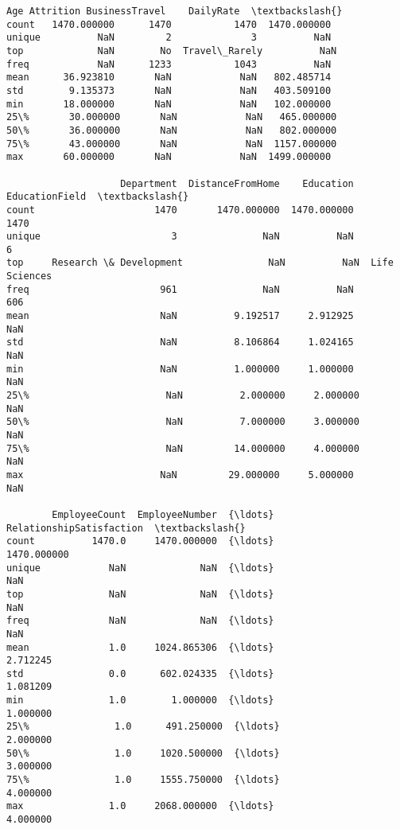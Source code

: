 \documentclass[11pt]{article}
\makeatletter
\newcommand{\boxspacing}{\kern\kvtcb@left@rule\kern\kvtcb@boxsep}
\newcommand{\prompt}[4]{
        {\ttfamily\llap{{\color{#2}[#3]:\hspace{3pt}#4}}\vspace{-\baselineskip}}
    }
\makeatother
\begin{document}
            \begin{tcolorbox}[breakable, size=fbox, boxrule=.5pt, pad at break*=1mm, opacityfill=0]
\prompt{Out}{outcolor}{19}{\boxspacing}
\begin{Verbatim}[commandchars=\\\{\}]
                Age Attrition BusinessTravel    DailyRate  \textbackslash{}
count   1470.000000      1470           1470  1470.000000
unique          NaN         2              3          NaN
top             NaN        No  Travel\_Rarely          NaN
freq            NaN      1233           1043          NaN
mean      36.923810       NaN            NaN   802.485714
std        9.135373       NaN            NaN   403.509100
min       18.000000       NaN            NaN   102.000000
25\%       30.000000       NaN            NaN   465.000000
50\%       36.000000       NaN            NaN   802.000000
75\%       43.000000       NaN            NaN  1157.000000
max       60.000000       NaN            NaN  1499.000000

                    Department  DistanceFromHome    Education EducationField  \textbackslash{}
count                     1470       1470.000000  1470.000000           1470
unique                       3               NaN          NaN              6
top     Research \& Development               NaN          NaN  Life Sciences
freq                       961               NaN          NaN            606
mean                       NaN          9.192517     2.912925            NaN
std                        NaN          8.106864     1.024165            NaN
min                        NaN          1.000000     1.000000            NaN
25\%                        NaN          2.000000     2.000000            NaN
50\%                        NaN          7.000000     3.000000            NaN
75\%                        NaN         14.000000     4.000000            NaN
max                        NaN         29.000000     5.000000            NaN

        EmployeeCount  EmployeeNumber  {\ldots}  RelationshipSatisfaction  \textbackslash{}
count          1470.0     1470.000000  {\ldots}               1470.000000
unique            NaN             NaN  {\ldots}                       NaN
top               NaN             NaN  {\ldots}                       NaN
freq              NaN             NaN  {\ldots}                       NaN
mean              1.0     1024.865306  {\ldots}                  2.712245
std               0.0      602.024335  {\ldots}                  1.081209
min               1.0        1.000000  {\ldots}                  1.000000
25\%               1.0      491.250000  {\ldots}                  2.000000
50\%               1.0     1020.500000  {\ldots}                  3.000000
75\%               1.0     1555.750000  {\ldots}                  4.000000
max               1.0     2068.000000  {\ldots}                  4.000000


\end{Verbatim}
\end{tcolorbox}
\end{document}

